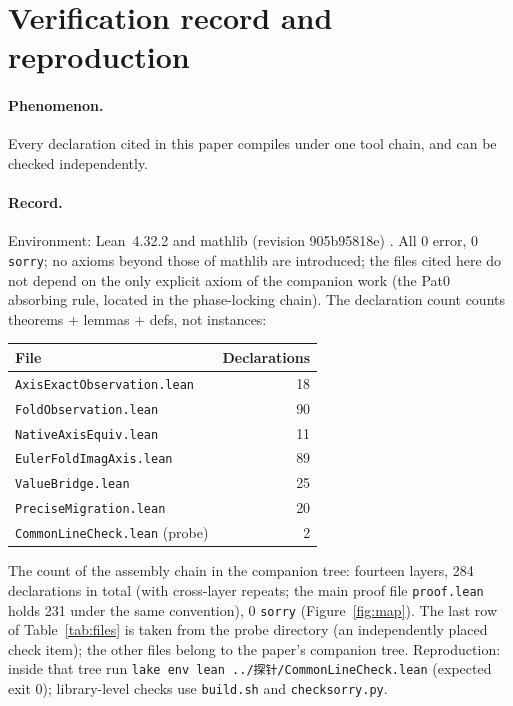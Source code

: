 \documentclass{article}
\renewcommand{\_}{\underscoreOrig\allowbreak}
\begin{document}
\section{Verification record and reproduction}
\label{sec:verify}

\paragraph{Phenomenon.} Every declaration cited in this paper compiles
under one tool chain, and can be checked independently.

\paragraph{Record.} Environment: Lean~4.32.2 and mathlib (revision
905b95818e) \cite{mathlib, lean}. All 0 error, 0 \texttt{sorry}; no
axioms beyond those of mathlib are introduced; the files cited here do
not depend on the only explicit axiom of the companion work (the Pat0
absorbing rule, located in the phase-locking chain). The declaration
count counts theorems $+$ lemmas $+$ defs, not instances:

\begin{center}
\begin{tabular}{lr}
\hline
File & Declarations \\
\hline
\texttt{AxisExactObservation.lean} & 18 \\
\texttt{FoldObservation.lean} & 90 \\
\texttt{NativeAxisEquiv.lean} & 11 \\
\texttt{EulerFoldImagAxis.lean} & 89 \\
\texttt{ValueBridge.lean} & 25 \\
\texttt{PreciseMigration.lean} & 20 \\
\texttt{CommonLineCheck.lean} (probe) & 2 \\
\hline
\end{tabular}
\end{center}
\label{tab:files}
\vspace{6pt}

The count of the assembly chain in the companion tree: fourteen layers,
284 declarations in total (with cross-layer repeats; the main proof file
\texttt{proof.lean} holds 231 under the same convention), 0
\texttt{sorry} (Figure~\ref{fig:map}). The last row of
Table~\ref{tab:files} is taken from the probe directory (an independently
placed check item); the other files belong to the paper's companion
tree. Reproduction: inside that tree run
\texttt{lake env lean ../\mbox{探针}\_20261010/CommonLineCheck.lean}
(expected exit 0); library-level checks use \texttt{build.sh} and
\texttt{check\_sorry.py}.
\end{document}
